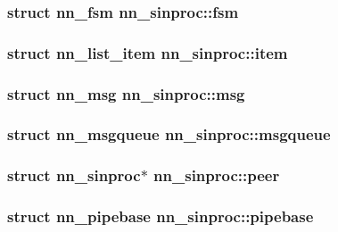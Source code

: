 \subsubsection[{fsm}]{\setlength{\rightskip}{0pt plus 5cm}struct {\bf nn\+\_\+fsm} nn\+\_\+sinproc\+::fsm}\hypertarget{structnn__sinproc_a003cd82bc6cff8db88c1a547a6636cb8}{}\label{structnn__sinproc_a003cd82bc6cff8db88c1a547a6636cb8}
\subsubsection[{item}]{\setlength{\rightskip}{0pt plus 5cm}struct {\bf nn\+\_\+list\+\_\+item} nn\+\_\+sinproc\+::item}\hypertarget{structnn__sinproc_a21419d9f464d248bb618e8954b80c843}{}\label{structnn__sinproc_a21419d9f464d248bb618e8954b80c843}
\subsubsection[{msg}]{\setlength{\rightskip}{0pt plus 5cm}struct {\bf nn\+\_\+msg} nn\+\_\+sinproc\+::msg}\hypertarget{structnn__sinproc_acc15a46ac42799ae2a0726f2baae8c4b}{}\label{structnn__sinproc_acc15a46ac42799ae2a0726f2baae8c4b}
\subsubsection[{msgqueue}]{\setlength{\rightskip}{0pt plus 5cm}struct {\bf nn\+\_\+msgqueue} nn\+\_\+sinproc\+::msgqueue}\hypertarget{structnn__sinproc_ab654cbbbc30b3b2e2a26719492fa4b98}{}\label{structnn__sinproc_ab654cbbbc30b3b2e2a26719492fa4b98}
\subsubsection[{peer}]{\setlength{\rightskip}{0pt plus 5cm}struct {\bf nn\+\_\+sinproc}$\ast$ nn\+\_\+sinproc\+::peer}\hypertarget{structnn__sinproc_a5bb8b30fe9e4c46aff1bfe5ef2d555df}{}\label{structnn__sinproc_a5bb8b30fe9e4c46aff1bfe5ef2d555df}
\subsubsection[{pipebase}]{\setlength{\rightskip}{0pt plus 5cm}struct {\bf nn\+\_\+pipebase} nn\+\_\+sinproc\+::pipebase}\hypertarget{structnn__sinproc_ae5e3756290ad85bbe90b48472cea16e1}{}\label{structnn__sinproc_ae5e3756290ad85bbe90b48472cea16e1}
